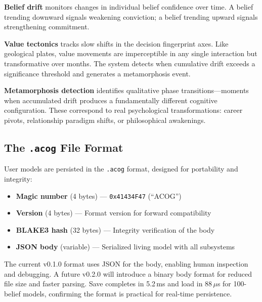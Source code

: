 \documentclass[10pt, twocolumn]{article}
\begin{document}
\textbf{Belief drift} monitors changes in individual belief confidence over time. A belief trending downward signals weakening conviction; a belief trending upward signals strengthening commitment.

\textbf{Value tectonics} tracks slow shifts in the decision fingerprint axes. Like geological plates, value movements are imperceptible in any single interaction but transformative over months. The system detects when cumulative drift exceeds a significance threshold and generates a metamorphosis event.

\textbf{Metamorphosis detection} identifies qualitative phase transitions---moments when accumulated drift produces a fundamentally different cognitive configuration. These correspond to real psychological transformations: career pivots, relationship paradigm shifts, or philosophical awakenings.

\subsection{The \texttt{.acog} File Format}
\label{sec:format}

User models are persisted in the \texttt{.acog} format, designed for portability and integrity:

\begin{itemize}[nosep, leftmargin=*]
  \item \textbf{Magic number} (4 bytes) --- \texttt{0x41434F47} (``ACOG'')
  \item \textbf{Version} (4 bytes) --- Format version for forward compatibility
  \item \textbf{BLAKE3 hash} (32 bytes) --- Integrity verification of the body~\cite{blake3}
  \item \textbf{JSON body} (variable) --- Serialized living model with all subsystems
\end{itemize}

The current v0.1.0 format uses JSON for the body, enabling human inspection and debugging. A future v0.2.0 will introduce a binary body format for reduced file size and faster parsing. Save completes in 5.2\,ms and load in 88\,$\mu$s for 100-belief models, confirming the format is practical for real-time persistence.


\end{document}
